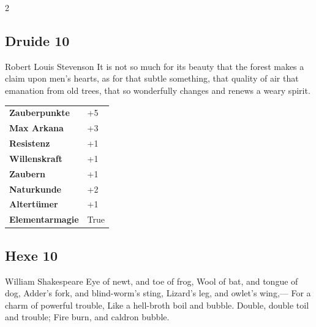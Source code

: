 \begin{multicols}{2}
\begin{tcolorbox}
    \subsection*{Druide \hfill \small{10 }}
    \tcblower


\begin{pquote}{Robert Louis Stevenson}
It is not so much for its beauty that the forest makes a claim upon men’s hearts, as for that subtle something, that quality of air that emanation from old trees, that so wonderfully changes and renews a weary spirit.
\end{pquote}

\vspace{3mm}

\begin{tabular}{@{}ll@{}}
    \textbf{Zauberpunkte} & +5\\
    \textbf{Max Arkana} & +3\\
    \textbf{Resistenz} & +1\\
    \textbf{Willenskraft} & +1\\
    \textbf{Zaubern} & +1\\
    \textbf{Naturkunde} & +2\\
    \textbf{Altertümer} & +1\\
    \textbf{Elementarmagie} & True\\
\end{tabular}


\end{tcolorbox}

\begin{tcolorbox}
    \subsection*{Hexe \hfill \small{10 }}
    \tcblower


\begin{pquote}{William Shakespeare}
Eye of newt, and toe of frog,
Wool of bat, and tongue of dog,
Adder's fork, and blind-worm's sting,
Lizard's leg, and owlet's wing,—
For a charm of powerful trouble,
Like a hell-broth boil and bubble.
Double, double toil and trouble;
Fire burn, and caldron bubble.
\end{pquote}


\end{tcolorbox}
\end{multicols}
